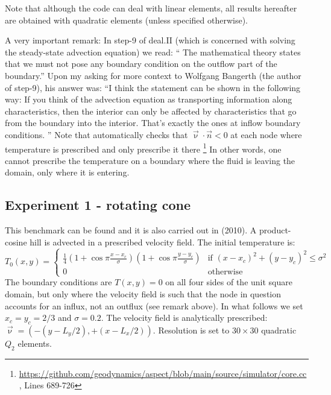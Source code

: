 Note that although the code can deal with linear elements, all results 
hereafter are obtained with quadratic elements (unless specified otherwise). 

A very important remark: In step-9 of deal.II (which is concerned with solving the 
steady-state advection equation) we read: `` The mathematical theory states that we must not 
pose any boundary condition on the outflow part of the boundary.''
Upon my asking for more context to Wolfgang Bangerth (the author of step-9), his answer was:
``I think the statement can be shown in the following way: If
you think of the advection equation as transporting information along
characteristics, then the interior can only be affected by characteristics
that go from the boundary into the interior. That's exactly the ones at inflow
boundary conditions. ''
Note that \aspect automatically checks that $\vec\upnu\cdot\vec{n}<0$ at each node where temperature is
prescribed and only prescribe it there
\footnote{\url{https://github.com/geodynamics/aspect/blob/main/source/simulator/core.cc}, Lines 689-726} 
In other words, one cannot prescribe the temperature on a
boundary where the fluid is leaving the domain, only where it is entering.





\newpage
\subsection*{Experiment 1 - rotating cone}

This benchmark can be found \textcite{dohu03} and it is also carried out in \textcite{bepo10} (2010).
A product-cosine hill is advected in a prescribed velocity field. 
The initial temperature is:
\begin{equation}
T_0(x,y)=
\left\{
\begin{array}{cc}
\frac{1}{4}
\left(1+\cos \pi\frac{x-x_c}{\sigma}\right)
\left(1+\cos \pi\frac{y-y_c}{\sigma}\right)
& \text{if } (x-x_c)^2+(y-y_c)^2\leq \sigma^2 \\
0 & \text{otherwise}
\end{array}
\right.
\end{equation}
The boundary conditions are $T(x,y)=0$ on all four sides of the unit square domain, but only 
where the velocity field is such that the node in question accounts for an influx, 
not an outflux (see remark above).
In what follows we set $x_c=y_c=2/3$ and $\sigma=0.2$.  
The velocity field is analytically prescribed: $\vec\upnu=(-(y-L_y/2),+(x-L_x/2))$.
Resolution is set to $30\times30$ quadratic $Q_2$ elements.

